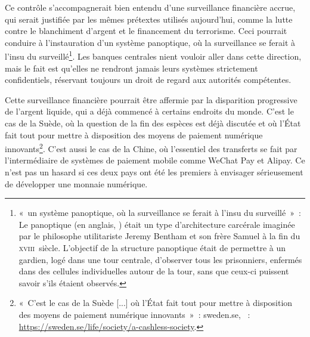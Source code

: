Ce contrôle s'accompagnerait bien entendu d'une surveillance financière accrue, qui serait justifiée par les mêmes prétextes utilisés aujourd'hui, comme la lutte contre le blanchiment d'argent et le financement du terrorisme. Ceci pourrait conduire à l'instauration d'un système panoptique, où la surveillance se ferait à l'insu du surveillé\footnote{«~un système panoptique, où la surveillance se ferait à l'insu du surveillé~»~: Le panoptique (en anglais, ) était un type d'architecture carcérale imaginée par le philosophe utilitariste Jeremy Bentham et son frère Samuel à la fin du \textsc{xviii}\ieme{}~siècle. L'objectif de la structure panoptique était de permettre à un gardien, logé dans une tour centrale, d'observer tous les prisonniers, enfermés dans des cellules individuelles autour de la tour, sans que ceux-ci puissent savoir s'ils étaient observés.}. Les banques centrales nient vouloir aller dans cette direction, mais le fait est qu'elles ne rendront jamais leurs systèmes strictement confidentiels, réservant toujours un droit de regard aux autorités compétentes. %

Cette surveillance financière pourrait être affermie par la disparition progressive de l'argent liquide, qui a déjà commencé à certains endroits du monde. C'est le cas de la Suède, où la question de la fin des espèces est déjà discutée et où l'État fait tout pour mettre à disposition des moyens de paiement numérique innovants\footnote{«~C'est le cas de la Suède [...] où l'État fait tout pour mettre à disposition des moyens de paiement numérique innovants~»~: sweden.se, ~: \url{https://sweden.se/life/society/a-cashless-society}.}. C'est aussi le cas de la Chine, où l'essentiel des transferts se fait par l'intermédiaire de systèmes de paiement mobile comme WeChat Pay et Alipay. Ce n'est pas un hasard si ces deux pays ont été les premiers à envisager sérieusement de développer une monnaie numérique. %

